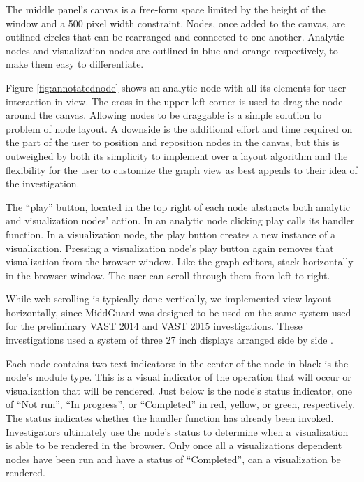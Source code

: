 \documentclass[midd]{thesis}
\begin{document}
The middle panel's canvas is a free-form space limited by the height of the
window and a 500 pixel width constraint. Nodes, once added to the canvas, are
outlined circles that can be rearranged and connected to one another. Analytic
nodes and visualization nodes are outlined in blue and orange respectively, to
make them easy to differentiate.

Figure \ref{fig:annotatednode} shows an analytic node with all its elements for
user interaction in view. The cross in the upper left corner is used to drag the
node around the canvas. Allowing nodes to be draggable is a simple solution to
problem of node layout. A downside is the additional effort and time required on
the part of the user to position and reposition nodes in the canvas, but this is
outweighed by both its simplicity to implement over a layout algorithm and the
flexibility for the user to customize the graph view as best appeals to their
idea of the investigation.

The ``play'' button, located in the top right of each node abstracts both
analytic and visualization nodes' action. In an analytic node clicking play
calls its handler function. In a visualization node, the play button creates a
new instance of a visualization. Pressing a visualization node's play button
again removes that visualization from the browser window. Like the graph
editors, stack horizontally in the browser window. The user can scroll through
them from left to right.

While web scrolling is typically done vertically, we implemented view layout
horizontally, since MiddGuard was designed to be used on the same system used
for the preliminary VAST 2014 and VAST 2015 investigations. These investigations
used a system of three 27 inch displays arranged side by side
\cite{middguard-dinofunworld}.

Each node contains two text indicators: in the center of the node in black is
the node's module type. This is a visual indicator of the operation that will
occur or visualization that will be rendered. Just below is the node's status
indicator, one of ``Not run'', ``In progress'', or ``Completed'' in red, yellow,
or green, respectively. The status indicates whether the handler function has
already been invoked. Investigators ultimately use the node's status to
determine when a visualization is able to be rendered in the browser. Only once
all a visualizations dependent nodes have been run and have a status of
``Completed'', can a visualization be rendered.
\end{document}
